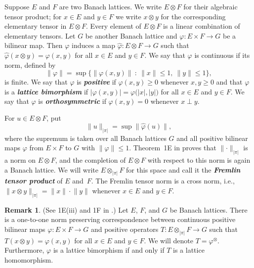 \documentclass[12pt]{amsart}
\theoremstyle{plain}
\theoremstyle{definition}
\newtheorem{remark}[theorem]{Remark}
\newcommand{\abs}[1]{\lvert#1\rvert}
\newcommand{\norm}[1]{\lVert#1\rVert}
\newcommand{\bigabs}[1]{\bigl\lvert#1\bigr\rvert}
\newcommand{\bignorm}[1]{\bigl\lVert#1\bigr\rVert}
\renewcommand{\le}{\leqslant}
\renewcommand{\ge}{\geqslant}
\renewcommand{\mid}{\::\:}
\newcommand{\term}[1]{{\textit{\textbf{#1}}}}
\def\api{{\abs{\!\pi\!}}}
\def\ftp{\otimes_{\!\scriptscriptstyle\api}\!}
\begin{document}
Suppose $E$ and $F$ are two Banach lattices. We write $E\otimes F$ for
their algebraic tensor product; for $x\in E$ and $y\in F$ we write
$x\otimes y$ for the corresponding elementary tensor in $E\otimes F$.
Every element of $E\otimes F$ is a linear combination of elementary
tensors. Let $G$ be another Banach lattice and $\varphi\colon E\times
F\to G$ be a bilinear map. Then $\varphi$ induces a map
$\hat\varphi\colon E\otimes F\to G$ such that $\hat\varphi(x\otimes
y)=\varphi(x,y)$ for all $x\in E$ and $y\in F$. We say that $\varphi$
is continuous if its norm, defined by
\begin{displaymath}
  \norm{\varphi}=\sup\bigl\{\bignorm{\varphi(x,y)}\mid
  \norm{x}\le 1,\ \norm{y}\le 1\bigr\},
\end{displaymath}
is finite. We say that $\varphi$ is \term{positive} if
$\varphi(x,y)\ge 0$ whenever $x,y\ge 0$ and that $\varphi$ is a
\term{lattice bimorphism} if
$\bigabs{\varphi(x,y)}=\varphi\bigl(\abs{x},\abs{y}\bigr)$ for all
$x\in E$ and $y\in F$.  We say that $\varphi$ is \term{orthosymmetric}
if $\varphi(x,y)=0$ whenever $x\perp y$.

For $u\in E\otimes F$, put
\begin{equation}
  \label{norm-phi}
  \norm{u}_\api=
    \sup\norm{\hat\varphi(u)},
\end{equation}
where the supremum is taken over all Banach lattices $G$ and all
positive bilinear maps $\varphi$ from $E\times F$ to $G$ with
$\norm{\varphi}\le 1$. Theorem~1E in \cite[p.~89]{Fremlin:74} proves
that $\norm{\cdot}_\api$ is a norm on $E\otimes F$, and the completion
of $E\otimes F$ with respect to this norm is again a Banach lattice.
We will write $E\ftp F$ for this space and call it the
\term{Fremlin tensor product} of $E$ and~$F$. The Fremlin tensor norm
is a cross norm, i.e., $\norm{x\otimes y}_\api=\norm{x}\cdot\norm{y}$
whenever $x\in E$ and $y\in F$.

\begin{remark}\label{phi-tensor}
  (See 1E(iii) and 1F in \cite[p.~92]{Fremlin:74}.)  Let $E$, $F$, and
  $G$ be Banach lattices. There is a one-to-one norm preserving
  correspondence between continuous positive bilinear maps
  $\varphi\colon E\times F\to G$ and positive operators $T\colon E\ftp
  F\to G$ such that $T(x\otimes y)=\varphi(x,y)$ for all $x\in E$ and
  $y\in F$. We will denote $T=\varphi^\otimes$. Furthermore, $\varphi$
  is a lattice bimorphism if and only if $T$ is a lattice
  homomorphism.
\end{remark}
\end{document}

